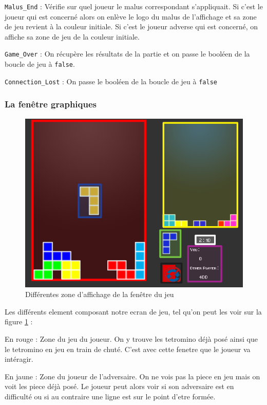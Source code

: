 \documentclass[a4paper, 12pt]{article}
\begin{document}
		\texttt{Malus\_End} :
		    Vérifie sur quel joueur le malus correspondant s’appliquait.
		    Si c’est le joueur qui est concerné alors on enlève le logo du malus de l’affichage et sa zone de jeu revient à la couleur initiale.
		    Si c’est le joueur adverse qui est concerné, on affiche sa zone de jeu de la couleur initiale.

		\texttt{Game\_Over} :
		    On récupère les résultats de la partie et on passe le booléen de la boucle de jeu à \texttt{false}.

		\texttt{Connection\_Lost} : 
		    On passe le booléen de la boucle de jeu à \texttt{false}
		    

		\subsubsection{La fenêtre graphiques}

			\begin{figure}[bt]
				\centering
				\includegraphics[scale=0.35]{img/fenetre.png}
				\caption{Différentes zone d'affichage de la fenêtre du jeu}
				\label{fig:fen}
			\end{figure}

			Les différents element composant notre ecran de jeu, tel qu'on peut les voir sur la figure \ref{fig:fen} : 

			En rouge : Zone du jeu du joueur. On y trouve les tetromino déjà posé ainsi que le tetromino en jeu en train de chuté. C’est avec cette fenetre que le joueur va intéragir.

			En jaune : Zone du joueur de l’adversaire. On ne vois pas la piece en jeu mais on voit les piece déjà posé. Le joueur peut alors voir si son adversaire est en difficulté ou si au contraire une ligne est sur le point d’etre formée.
\end{document}
